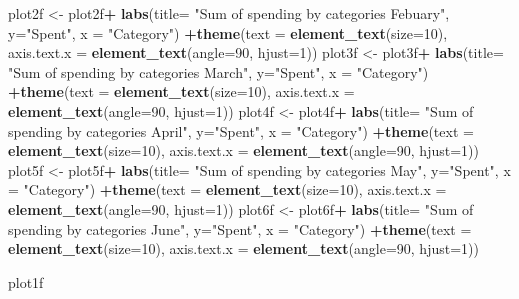 \documentclass[
]{article}
\newenvironment{Shaded}{\begin{snugshade}}{\end{snugshade}}
\newcommand{\DataTypeTok}[1]{\textcolor[rgb]{0.13,0.29,0.53}{#1}}
\newcommand{\DecValTok}[1]{\textcolor[rgb]{0.00,0.00,0.81}{#1}}
\newcommand{\KeywordTok}[1]{\textcolor[rgb]{0.13,0.29,0.53}{\textbf{#1}}}
\newcommand{\NormalTok}[1]{#1}
\newcommand{\OperatorTok}[1]{\textcolor[rgb]{0.81,0.36,0.00}{\textbf{#1}}}
\newcommand{\StringTok}[1]{\textcolor[rgb]{0.31,0.60,0.02}{#1}}
\begin{document}
\begin{Shaded}
\begin{Highlighting}[]
\NormalTok{plot2f <-}\StringTok{ }\NormalTok{plot2f}\OperatorTok{+}\StringTok{ }\KeywordTok{labs}\NormalTok{(}\DataTypeTok{title=} \StringTok{"Sum of spending by categories Febuary"}\NormalTok{, }\DataTypeTok{y=}\StringTok{"Spent"}\NormalTok{, }\DataTypeTok{x =} \StringTok{"Category"}\NormalTok{) }\OperatorTok{+}\KeywordTok{theme}\NormalTok{(}\DataTypeTok{text =} \KeywordTok{element_text}\NormalTok{(}\DataTypeTok{size=}\DecValTok{10}\NormalTok{), }\DataTypeTok{axis.text.x =} \KeywordTok{element_text}\NormalTok{(}\DataTypeTok{angle=}\DecValTok{90}\NormalTok{, }\DataTypeTok{hjust=}\DecValTok{1}\NormalTok{)) }
\NormalTok{plot3f <-}\StringTok{ }\NormalTok{plot3f}\OperatorTok{+}\StringTok{ }\KeywordTok{labs}\NormalTok{(}\DataTypeTok{title=} \StringTok{"Sum of spending by categories March"}\NormalTok{, }\DataTypeTok{y=}\StringTok{"Spent"}\NormalTok{, }\DataTypeTok{x =} \StringTok{"Category"}\NormalTok{) }\OperatorTok{+}\KeywordTok{theme}\NormalTok{(}\DataTypeTok{text =} \KeywordTok{element_text}\NormalTok{(}\DataTypeTok{size=}\DecValTok{10}\NormalTok{), }\DataTypeTok{axis.text.x =} \KeywordTok{element_text}\NormalTok{(}\DataTypeTok{angle=}\DecValTok{90}\NormalTok{, }\DataTypeTok{hjust=}\DecValTok{1}\NormalTok{)) }
\NormalTok{plot4f <-}\StringTok{ }\NormalTok{plot4f}\OperatorTok{+}\StringTok{ }\KeywordTok{labs}\NormalTok{(}\DataTypeTok{title=} \StringTok{"Sum of spending by categories April"}\NormalTok{, }\DataTypeTok{y=}\StringTok{"Spent"}\NormalTok{, }\DataTypeTok{x =} \StringTok{"Category"}\NormalTok{) }\OperatorTok{+}\KeywordTok{theme}\NormalTok{(}\DataTypeTok{text =} \KeywordTok{element_text}\NormalTok{(}\DataTypeTok{size=}\DecValTok{10}\NormalTok{), }\DataTypeTok{axis.text.x =} \KeywordTok{element_text}\NormalTok{(}\DataTypeTok{angle=}\DecValTok{90}\NormalTok{, }\DataTypeTok{hjust=}\DecValTok{1}\NormalTok{)) }
\NormalTok{plot5f <-}\StringTok{ }\NormalTok{plot5f}\OperatorTok{+}\StringTok{ }\KeywordTok{labs}\NormalTok{(}\DataTypeTok{title=} \StringTok{"Sum of spending by categories May"}\NormalTok{, }\DataTypeTok{y=}\StringTok{"Spent"}\NormalTok{, }\DataTypeTok{x =} \StringTok{"Category"}\NormalTok{) }\OperatorTok{+}\KeywordTok{theme}\NormalTok{(}\DataTypeTok{text =} \KeywordTok{element_text}\NormalTok{(}\DataTypeTok{size=}\DecValTok{10}\NormalTok{), }\DataTypeTok{axis.text.x =} \KeywordTok{element_text}\NormalTok{(}\DataTypeTok{angle=}\DecValTok{90}\NormalTok{, }\DataTypeTok{hjust=}\DecValTok{1}\NormalTok{)) }
\NormalTok{plot6f <-}\StringTok{ }\NormalTok{plot6f}\OperatorTok{+}\StringTok{ }\KeywordTok{labs}\NormalTok{(}\DataTypeTok{title=} \StringTok{"Sum of spending by categories June"}\NormalTok{, }\DataTypeTok{y=}\StringTok{"Spent"}\NormalTok{, }\DataTypeTok{x =} \StringTok{"Category"}\NormalTok{) }\OperatorTok{+}\KeywordTok{theme}\NormalTok{(}\DataTypeTok{text =} \KeywordTok{element_text}\NormalTok{(}\DataTypeTok{size=}\DecValTok{10}\NormalTok{), }\DataTypeTok{axis.text.x =} \KeywordTok{element_text}\NormalTok{(}\DataTypeTok{angle=}\DecValTok{90}\NormalTok{, }\DataTypeTok{hjust=}\DecValTok{1}\NormalTok{)) }


\NormalTok{plot1f}
\end{Highlighting}
\end{Shaded}
\end{document}
